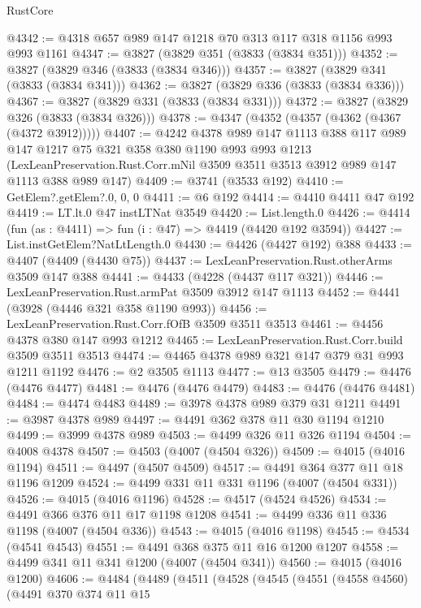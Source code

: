 \begin{lexlean}{RustCore}
\begin{coremodule}
@4342 := @4318 @657 @989 @147 @1218 @70 @313 @117 @318 @1156 @993 @993 @1161
@4347 := @3827 (@3829 @351 (@3833 (@3834 @351)))
@4352 := @3827 (@3829 @346 (@3833 (@3834 @346)))
@4357 := @3827 (@3829 @341 (@3833 (@3834 @341)))
@4362 := @3827 (@3829 @336 (@3833 (@3834 @336)))
@4367 := @3827 (@3829 @331 (@3833 (@3834 @331)))
@4372 := @3827 (@3829 @326 (@3833 (@3834 @326)))
@4378 := @4347 (@4352 (@4357 (@4362 (@4367 (@4372 @3912)))))
@4407 := @4242
    @4378
    @989
    @147
    @1113
    @388
    @117
    @989
    @147
    @1217
    @75
    @321
    @358
    @380
    @1190
    @993
    @993
    @1213
    (LexLeanPreservation.Rust.Corr.mNil @3509 @3511 @3513 @3912 @989 @147 @1113 @388 @989 @147)
@4409 := @3741 (@3533 @192)
@4410 := GetElem?.getElem?.{0, 0, 0}
@4411 := @6 @192
@4414 := @4410 @4411 @47 @192
@4419 := LT.lt.{0} @47 instLTNat @3549
@4420 := List.length.{0}
@4426 := @4414 (fun (as : @4411) => fun (i : @47) => @4419 (@4420 @192 @3594))
@4427 := List.instGetElem?NatLtLength.{0}
@4430 := @4426 (@4427 @192) @388
@4433 := @4407 (@4409 (@4430 @75))
@4437 := LexLeanPreservation.Rust.otherArms @3509 @147 @388
@4441 := @4433 (@4228 (@4437 @117 @321))
@4446 := LexLeanPreservation.Rust.armPat @3509 @3912 @147 @1113
@4452 := @4441 (@3928 (@4446 @321 @358 @1190 @993))
@4456 := LexLeanPreservation.Rust.Corr.fOfB @3509 @3511 @3513
@4461 := @4456 @4378 @380 @147 @993 @1212
@4465 := LexLeanPreservation.Rust.Corr.build @3509 @3511 @3513
@4474 := @4465 @4378 @989 @321 @147 @379 @31 @993 @1211 @1192
@4476 := @2 @3505 @1113
@4477 := @13 @3505
@4479 := @4476 (@4476 @4477)
@4481 := @4476 (@4476 @4479)
@4483 := @4476 (@4476 @4481)
@4484 := @4474 @4483
@4489 := @3978 @4378 @989 @379 @31 @1211
@4491 := @3987 @4378 @989
@4497 := @4491 @362 @378 @11 @30 @1194 @1210
@4499 := @3999 @4378 @989
@4503 := @4499 @326 @11 @326 @1194
@4504 := @4008 @4378
@4507 := @4503 (@4007 (@4504 @326))
@4509 := @4015 (@4016 @1194)
@4511 := @4497 (@4507 @4509)
@4517 := @4491 @364 @377 @11 @18 @1196 @1209
@4524 := @4499 @331 @11 @331 @1196 (@4007 (@4504 @331))
@4526 := @4015 (@4016 @1196)
@4528 := @4517 (@4524 @4526)
@4534 := @4491 @366 @376 @11 @17 @1198 @1208
@4541 := @4499 @336 @11 @336 @1198 (@4007 (@4504 @336))
@4543 := @4015 (@4016 @1198)
@4545 := @4534 (@4541 @4543)
@4551 := @4491 @368 @375 @11 @16 @1200 @1207
@4558 := @4499 @341 @11 @341 @1200 (@4007 (@4504 @341))
@4560 := @4015 (@4016 @1200)
@4606 := @4484
    (@4489
      (@4511
        (@4528
          (@4545
            (@4551
              (@4558 @4560)
              (@4491
                @370
                @374
                @11
                @15

\end{coremodule}
\end{lexlean}
